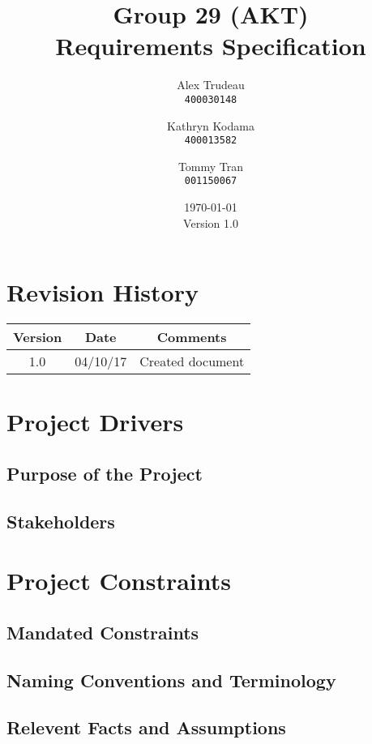 \documentclass[12pt,fleqn]{article}
\title{Group 29 (AKT)\\ Requirements Specification}
\author{
Alex Trudeau\\
	\texttt{400030148}
\and
Kathryn Kodama\\
  	\texttt{400013582}
\and
Tommy Tran\\
	\texttt{001150067}
}
\date{\today\\Version 1.0}
\begin{document}
\maketitle

\pagebreak
\tableofcontents

\section* {Revision History}

\begin{tabular}{ |c| c| c| }
\hline
Version & Date & Comments \\
\hline
1.0 & 04/10/17 & Created document \\
\hline
\end{tabular}

\pagebreak

\section {Project Drivers}

\subsection {Purpose of the Project}

\subsection {Stakeholders}

\pagebreak

\section {Project Constraints}

\subsection {Mandated Constraints}

\subsection {Naming Conventions and Terminology}

\subsection {Relevent Facts and Assumptions}
\end{document}
